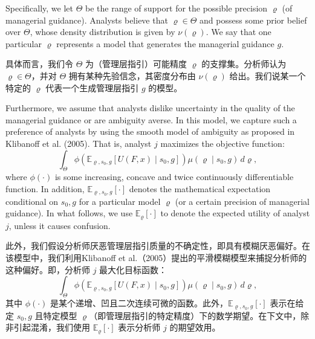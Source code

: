\documentclass[12pt,a4paper]{article}
\newenvironment{original}
  {\par\medskip\noindent\ignorespaces}
  {\par\medskip}
\newenvironment{translation}
  {\par\noindent{\color{transblue}\ignorespaces}}
  {\par\bigskip}
\begin{document}
\begin{original}
Specifically, we let $\Theta$ be the range of support for the possible precision $\varrho$ (of managerial guidance). Analysts believe that $\varrho \in \Theta$ and possess some prior belief over $\Theta$, whose density distribution is given by $\nu(\varrho)$. We say that one particular $\varrho$ represents a model that generates the managerial guidance $g$.
\end{original}
\begin{translation}
具体而言，我们令 $\Theta$ 为（管理层指引）可能精度 $\varrho$ 的支撑集。分析师认为 $\varrho \in \Theta$，并对 $\Theta$ 拥有某种先验信念，其密度分布由 $\nu(\varrho)$ 给出。我们说某一个特定的 $\varrho$ 代表一个生成管理层指引 $g$ 的模型。
\end{translation}

\begin{original}
Furthermore, we assume that analysts dislike uncertainty in the quality of the managerial guidance or are ambiguity averse. In this model, we capture such a preference of analysts by using the smooth model of ambiguity as proposed in Klibanoff et al. (2005). That is, analyst $j$ maximizes the objective function:
\[
\int_{\Theta} \phi\left( \mathbb{E}_{\varrho,s_0,g}\left[ U(F,x) \mid s_0, g \right] \right) \mu(\varrho \mid s_0, g) \, d\varrho, \tag{4}
\]
where $\phi(\cdot)$ is some increasing, concave and twice continuously differentiable function. In addition, $\mathbb{E}_{\varrho,s_0,g}[\cdot]$ denotes the mathematical expectation conditional on $s_0, g$ for a particular model $\varrho$ (or a certain precision of managerial guidance). In what follows, we use $\mathbb{E}_{\varrho}[\cdot]$ to denote the expected utility of analyst $j$, unless it causes confusion.
\end{original}
\begin{translation}
此外，我们假设分析师厌恶管理层指引质量的不确定性，即具有模糊厌恶偏好。在该模型中，我们利用Klibanoff et al.（2005）提出的平滑模糊模型来捕捉分析师的这种偏好。即，分析师 $j$ 最大化目标函数：
\[
\int_{\Theta} \phi\left( \mathbb{E}_{\varrho,s_0,g}\left[ U(F,x) \mid s_0, g \right] \right) \mu(\varrho \mid s_0, g) \, d\varrho, \tag{4}
\]
其中 $\phi(\cdot)$ 是某个递增、凹且二次连续可微的函数。此外，$\mathbb{E}_{\varrho,s_0,g}[\cdot]$ 表示在给定 $s_0, g$ 且特定模型 $\varrho$（即管理层指引的特定精度）下的数学期望。在下文中，除非引起混淆，我们使用 $\mathbb{E}_{\varrho}[\cdot]$ 表示分析师 $j$ 的期望效用。
\end{translation}
\end{document}
